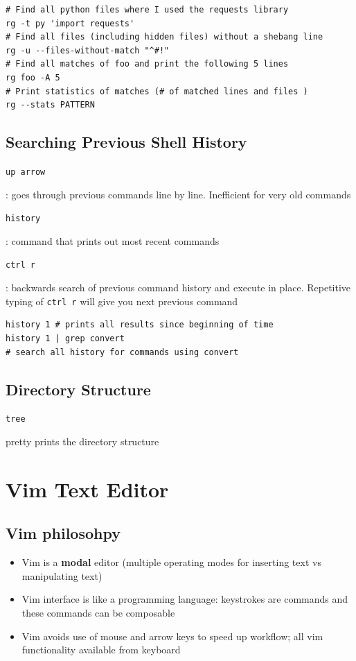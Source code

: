 \documentclass[letterpaper,12pt]{article}
\newcommand*{\lstitem}[1]{
  \setbox0\hbox{\lstinline{#1}}
  \item[\usebox0]
}
\begin{document}
\begin{lstlisting}
# Find all python files where I used the requests library
rg -t py 'import requests'
# Find all files (including hidden files) without a shebang line
rg -u --files-without-match "^#!"
# Find all matches of foo and print the following 5 lines
rg foo -A 5
# Print statistics of matches (# of matched lines and files )
rg --stats PATTERN
\end{lstlisting}

\subsection{Searching Previous Shell History}

\begin{description}
 \lstitem{up arrow}: goes through previous commands line by line. Inefficient for very old commands
 \lstitem{history}: command that prints out most recent commands
 \lstitem{ctrl r}: backwards search of previous command history and execute in place. Repetitive typing of \lstinline{ctrl r}  will give you next previous command
\end{description}

\begin{lstlisting}
history 1 # prints all results since beginning of time
history 1 | grep convert
# search all history for commands using convert
\end{lstlisting}


\subsection{Directory Structure}
\begin{description}
 \lstitem{tree} pretty prints the directory structure
\end{description}

\section{Vim Text Editor}

\subsection{Vim philosohpy}
\begin{itemize}
 \item Vim is a \textbf{modal} editor (multiple operating modes for inserting text vs manipulating text)
 \item Vim interface is like a programming language: keystrokes are commands and these commands can be composable
 \item Vim avoids use of mouse and arrow keys to speed up workflow; all vim functionality available from keyboard
\end{itemize}
\end{document}
